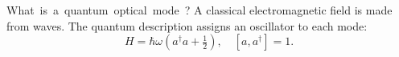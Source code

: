 \unit{What is a quantum optical mode?}
A classical electromagnetic field is made from waves.
The quantum description assigns an oscillator to each mode:
\[
H=\hbar\omega(a^\dagger a+\tfrac12),\quad [a,a^\dagger]=1.
\]
